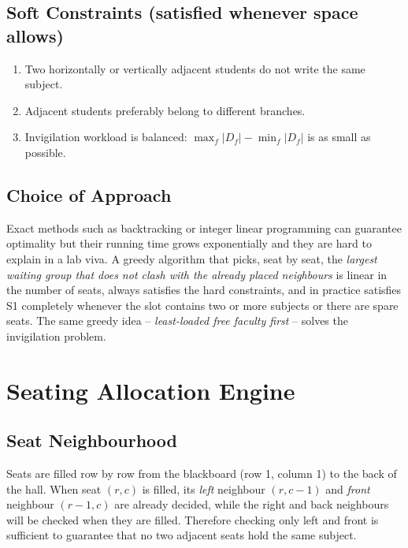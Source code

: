 \documentclass[11pt,a4paper]{article}
\begin{document}
\subsection{Soft Constraints (satisfied whenever space allows)}
\begin{enumerate}[label=\textbf{S\arabic*}]
  \item Two horizontally or vertically adjacent students do not write the same subject.
  \item Adjacent students preferably belong to different branches.
  \item Invigilation workload is balanced: $\max_f |D_f| - \min_f |D_f|$ is as small as possible.
\end{enumerate}

\subsection{Choice of Approach}
Exact methods such as backtracking or integer linear programming can guarantee optimality but their running time grows exponentially and they are hard to explain in a lab viva. A greedy algorithm that picks, seat by seat, the \emph{largest waiting group that does not clash with the already placed neighbours} is linear in the number of seats, always satisfies the hard constraints, and in practice satisfies S1 completely whenever the slot contains two or more subjects or there are spare seats. The same greedy idea -- \emph{least-loaded free faculty first} -- solves the invigilation problem.

\section{Seating Allocation Engine}
\subsection{Seat Neighbourhood}
Seats are filled row by row from the blackboard (row 1, column 1) to the back of the hall. When seat $(r, c)$ is filled, its \emph{left} neighbour $(r, c-1)$ and \emph{front} neighbour $(r-1, c)$ are already decided, while the right and back neighbours will be checked when they are filled. Therefore checking only left and front is sufficient to guarantee that no two adjacent seats hold the same subject.
\end{document}
